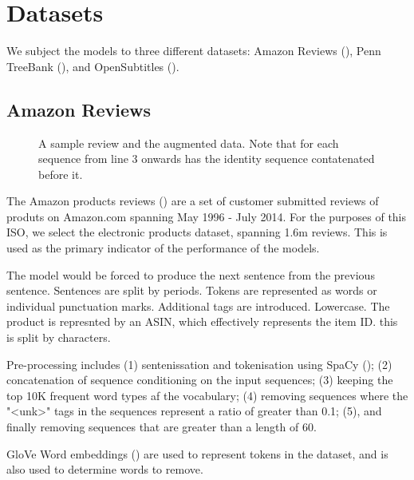 \documentclass[12pt,twoside]{report}
\begin{document}
\section{Datasets}

We subject the models to three different datasets: Amazon Reviews (\cite{he_ups_2016}), Penn TreeBank (\cite{marcus_building_2002}), and OpenSubtitles (\cite{lison_opensubtitles2016:_2016}). 

\subsection{Amazon Reviews}

\begin{figure}[!ht]
	\centering
	
	
	\caption{A sample review and the augmented data. Note that for each sequence from line 3 onwards has the identity sequence contatenated before it. \label{aug_1}}
\end{figure}

The Amazon products reviews (\cite{he_ups_2016}) are a set of customer submitted reviews of produts on Amazon.com spanning May 1996 - July 2014. For the purposes of this ISO, we select the electronic products dataset, spanning 1.6m reviews. This is used as the primary indicator of the performance of the models.

The model would be forced to produce the next sentence from the previous sentence. Sentences are split by periods. Tokens are represented as words or individual punctuation marks. Additional tags are introduced. Lowercase. The product is represnted by an ASIN, which effectively represents the item ID. this is split by characters.


Pre-processing includes (1) sentenissation and tokenisation using SpaCy (\cite{honnibal_spacy_2017}); (2) concatenation of sequence conditioning on the input sequences; (3) keeping the top 10K frequent word types af the vocabulary; (4) removing sequences where the "<unk>" tags in the sequences represent a ratio of greater than 0.1; (5), and finally removing sequences that are greater than a length of 60. 


GloVe Word embeddings (\cite{pennington_glove:_2014}) are used to represent tokens in the dataset, and is also used to determine words to remove. 
\end{document}
